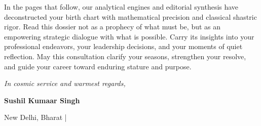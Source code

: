\begin{minipage}[t]{0.66\linewidth}
  {\fontsize{9}{13}\selectfont
  In the pages that follow, our analytical engines and editorial synthesis have deconstructed your birth chart with mathematical precision and classical shastric rigor. Read this dossier not as a prophecy of what must be, but as an empowering strategic dialogue with what is possible. Carry its insights into your professional endeavors, your leadership decisions, and your moments of quiet reflection. May this consultation clarify your seasons, strengthen your resolve, and guide your career toward enduring stature and purpose.}\par
  \vspace{3mm}

  {\fontsize{9}{12.5}\selectfont\itshape\color{MutedSlate} In cosmic service and warmest regards,}\par
  \vspace{2.5mm}
  {\sffamily\fontsize{9.5}{12}\selectfont\bfseries\color{ExecutiveNavy}Sushil Kumaar Singh}\par
  {\sffamily\fontsize{7.5}{9.5}\selectfont\color{MutedSlate}New Delhi, Bharat \textcolor{BorderSlate}{\enspace|\enspace} \ReportDate}
\end{minipage}
\clearpage
